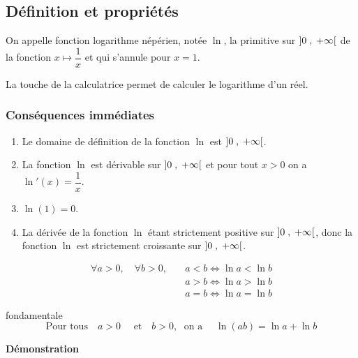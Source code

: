 
\everymath{\displaystyle}


\subsection{Définition et propriétés}


\begin{definition}
On appelle fonction logarithme népérien,  notée $ \ln $, la primitive   sur $ \left]0 \;,\; +\infty\right[ $ de la  fonction  $ x  \longmapsto \dfrac{1}{x} $  et qui s'annule pour  $ x=1 $.

\end{definition}


La touche \fbox{$ \ln $} de la calculatrice permet de calculer le logarithme d'un réel.
 
 \subsubsection*{Conséquences immédiates}
\begin{enumerate}
\item Le domaine de définition de la fonction $ \ln $  est  $ \left]0 \;,\; +\infty\right[ $.
\item La fonction $ \ln $  est  dérivable  sur  $ \left]0 \;,\; +\infty\right[ $  et pour tout $ x> 0 $ on a   $\ln'(x)=\dfrac{1}{x} $.
\item  $\ln (1)= 0$.
\item  La dérivée de la fonction $ \ln $ étant strictement positive  sur $ \left]0 \;,\; +\infty\right[ $, donc la  fonction $ \ln $  est strictement croissante sur  $ \left]0 \;,\; +\infty\right[ $.
\end{enumerate}

\begin{property}

\begin{align*}
    \forall a > 0, \quad  \forall b > 0 ,\quad & a< b \Longleftrightarrow \ln a < \ln b \\
    & a> b \Longleftrightarrow \ln a  >\ln b  \\
    & a= b \Longleftrightarrow \ln a  =\ln b
    \end{align*} 
   \end{property}

 \begin{property}{fondamentale}
$$\text{Pour tous}\quad  a> 0 \quad  \text{ et} \quad  b>0 ,\;\text{ on a }\quad  \ln(ab)=\ln a +\ln b $$
 \end{property}
\textbf{Démonstration}

